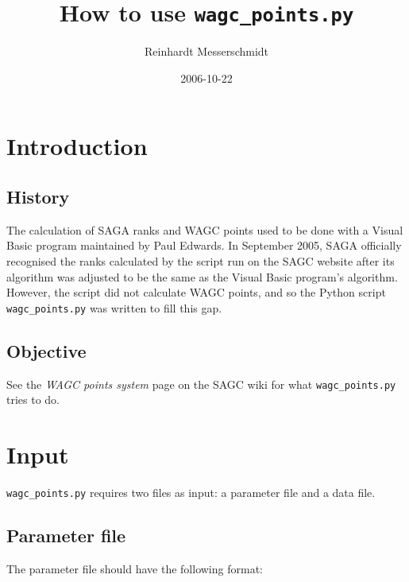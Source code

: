 \documentclass{article}
\title{How to use \texttt{wagc\_points.py}}
\author{Reinhardt Messerschmidt}
\date{2006-10-22}
\begin{document}
\maketitle

\section{Introduction}

\subsection{History}
The calculation of SAGA ranks and WAGC points used to be done with a Visual Basic program maintained by Paul Edwards. In September 2005,
SAGA officially recognised the ranks calculated by the script run on the SAGC website after its algorithm was adjusted to be the
same as the Visual Basic program's algorithm. However, the script did not calculate WAGC points, and so the  Python script 
\texttt{wagc\_points.py} was written to fill this gap.

\subsection{Objective}
See the \emph{WAGC points system} page on the SAGC wiki for what \texttt{wagc\_points.py} tries to do.

\section{Input}
\texttt{wagc\_points.py} requires two files as input: a parameter file and a data file.

\subsection{Parameter file}
The parameter file should have the following format:
\end{document}
